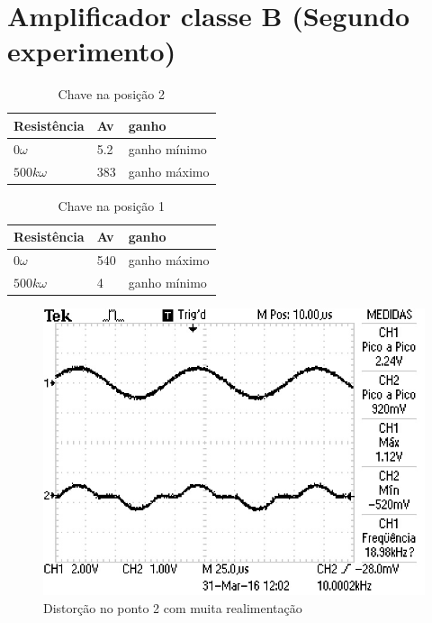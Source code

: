 \documentclass[openright]{normas-utf-tex} %
\begin{document}
\section{Amplificador classe B (Segundo experimento)}

\begin{table}[H]
\centering
\caption{Chave na posição 2}
\label{tab:ex2_pos2}
\begin{tabular}{|l|l|l|}
\hline
	Resistência & Av &  ganho\\ \hline
   	$0\omega$ & 5.2 & ganho mínimo \\ \hline
    $500k\omega$ & 383 & ganho máximo \\ \hline
\end{tabular}
\end{table}

\begin{table}[H]
\centering
\caption{Chave na posição 1}
\label{tab:ex2_pos2}
\begin{tabular}{|l|l|l|}
\hline
	Resistência & Av &  ganho\\ \hline
    $0\omega$ & 540 & ganho máximo \\ \hline
    $500k\omega$ & 4 & ganho mínimo \\ \hline
\end{tabular}
\end{table}

\begin{figure}[H]
\centering
\includegraphics[width=0.8\linewidth]{img/Circ2_Distorcao1.JPG}
\caption{Distorção no ponto 2 com muita realimentação}
\label{fig:resp_freq_com_real_fase}
\end{figure}
\end{document}
